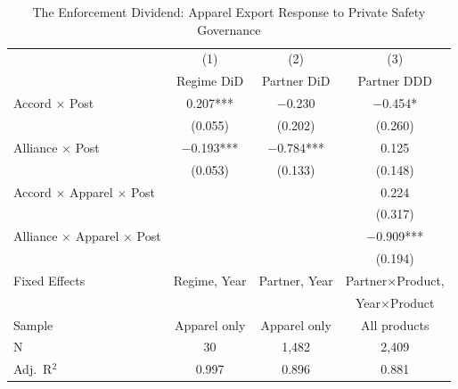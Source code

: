 \begin{table}[t]
\centering
\caption{The Enforcement Dividend: Apparel Export Response to Private Safety Governance}
\label{tab:main}
\begin{tabular}{lccc}
\toprule
& (1) & (2) & (3) \\
& Regime DiD & Partner DiD & Partner DDD \\
\midrule
Accord $\times$ Post & 0.207*** & $-$0.230 & $-$0.454* \\
& (0.055) & (0.202) & (0.260) \\
Alliance $\times$ Post & $-$0.193*** & $-$0.784*** & 0.125 \\
& (0.053) & (0.133) & (0.148) \\
Accord $\times$ Apparel $\times$ Post & & & 0.224 \\
& & & (0.317) \\
Alliance $\times$ Apparel $\times$ Post & & & $-$0.909*** \\
& & & (0.194) \\
\midrule
Fixed Effects & Regime, Year & Partner, Year & Partner$\times$Product, \\
& & & Year$\times$Product \\
Sample & Apparel only & Apparel only & All products \\
N & 30 & 1,482 & 2,409 \\
Adj.\ R$^2$ & 0.997 & 0.896 & 0.881 \\
\bottomrule
\end{tabular}
\par{}
\end{table}
